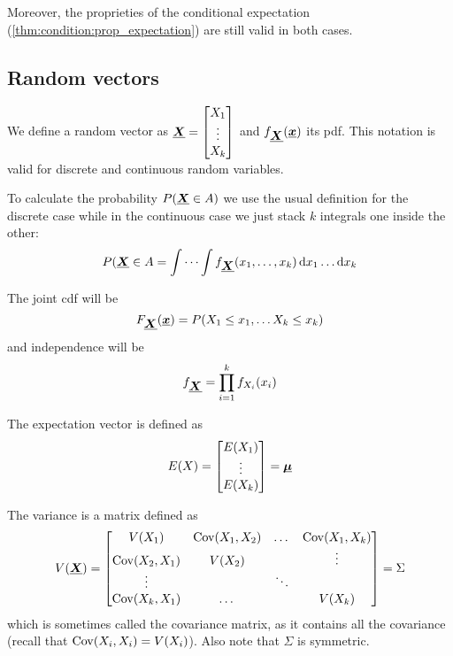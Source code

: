 \documentclass[12pt]{extarticle}
\newcommand{\cov}{{\operatorfont Cov}}
\renewcommand{\vec}[1]{\uvec{#1}}
\begin{document}
Moreover, the proprieties of the conditional expectation (\autoref{thm:condition:prop_expectation}) are still valid in both cases.

\subsection{Random vectors}

We define a random vector as $\vec X =
    \begin{bmatrix}
        X_1    \\
        \vdots \\
        X_k
    \end{bmatrix}$
and $f_{\vec X}(\vec x)$ its pdf.
This notation is valid for discrete and continuous random variables.

To calculate the probability $P(\vec X \in A)$ we use the usual definition for the discrete case while in the continuous case we just stack $k$ integrals one inside the other:
\begin{equation}
    P(\vec X \in A = \idotsint f_{\vec X}(x_1, \ldots, x_k) \dd{x_1} \ldots \dd{x_k}
\end{equation}

The joint cdf will be
\begin{equation}
    F_{\vec X}(\vec x) = P(X_1 \leq x_1, \ldots X_k \leq x_k)
\end{equation}
and independence will be
\begin{equation}
    f_{\vec X} = \prod_{i = 1}^{k} f_{X_i}(x_i)
\end{equation}

The expectation vector is defined as
\begin{equation}
    E(X) = \begin{bmatrix}
        E(X_1) \\
        \vdots \\
        E(X_k)
    \end{bmatrix} = \vec \mu
\end{equation}

The variance is a matrix defined as
\begin{equation}
    V(\vec X) = \begin{bmatrix}
        V(X_1)         & \cov(X_1, X_2) & \dots  & \cov(X_1, X_k) \\
        \cov(X_2, X_1) & V(X_2)         &        & \vdots         \\
        \vdots         &                & \ddots &                \\
        \cov(X_k, X_1) & \dots          &        & V(X_k)
    \end{bmatrix} = \Sigma
\end{equation}
which is sometimes called the covariance matrix, as it contains all the covariance (recall that $\cov(X_i, X_i)= V(X_i)$).
Also note that $\Sigma$ is symmetric.
\end{document}
